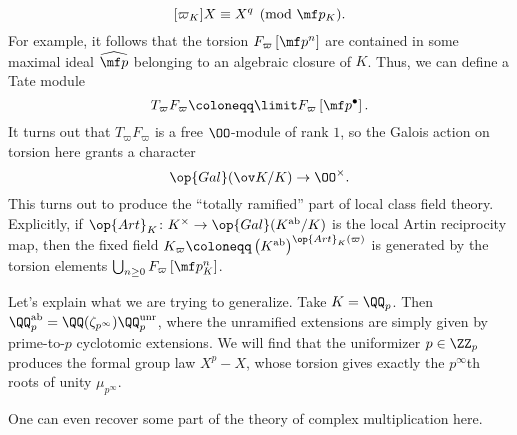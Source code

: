 \documentclass[../notes.tex]{subfiles}
\begin{document}
\[[\varpi_K]X\equiv X^q\pmod{\mf p_K}.\]
For example, it follows that the torsion $F_\varpi\left[\mf p^n\right]$ are contained in some maximal ideal $\widehat{\mf p}$ belonging to an algebraic closure of $K$. Thus, we can define a Tate module
\[T_\varpi F_\varpi\coloneqq\limit F_\varpi\left[\mf p^\bullet\right].\]
It turns out that $T_\varpi F_\varpi$ is a free $\OO$-module of rank $1$, so the Galois action on torsion here grants a character
\[\op{Gal}(\ov K/K)\to\OO^\times.\]
This turns out to produce the ``totally ramified'' part of local class field theory. Explicitly, if $\op{Art}_K\colon K^\times\to\op{Gal}(K^{\mathrm{ab}}/K)$ is the local Artin reciprocity map, then the fixed field $K_\varpi\coloneqq\left(K^{\mathrm{ab}}\right)^{\op{Art}_K(\varpi)}$ is generated by the torsion elements $\bigcup_{n\ge0}F_\varpi\left[\mf p_K^n\right]$.
\begin{example}
	Let's explain what we are trying to generalize. Take $K=\QQ_p$. Then $\QQ_p^{\mathrm{ab}}=\QQ(\zeta_{p^\infty})\QQ_p^{\mathrm{unr}}$, where the unramified extensions are simply given by prime-to-$p$ cyclotomic extensions. We will find that the uniformizer $p\in\ZZ_p$ produces the formal group law $X^p-X$, whose torsion gives exactly the $p^\infty$th roots of unity $\mu_{p^\infty}$.
\end{example}
One can even recover some part of the theory of complex multiplication here.
\end{document}
